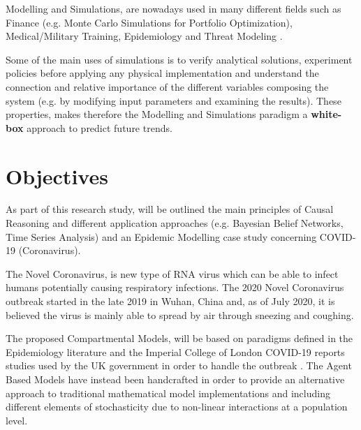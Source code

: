 Modelling and Simulations, are nowadays used in many different fields such as Finance (e.g. Monte Carlo Simulations for Portfolio Optimization), Medical/Military Training, Epidemiology and Threat Modeling \cite{mod_2, mod_3}. 

Some of the main uses of simulations is to verify analytical solutions, experiment policies before applying any physical implementation and understand the connection and relative importance of the different variables composing the system (e.g. by modifying input parameters and examining the results). These properties, makes therefore the Modelling and Simulations paradigm a \textbf{white-box} approach to predict future trends.

\section{Objectives}
\vspace{-0.1cm}
As part of this research study, will be outlined the main principles of Causal Reasoning and different application approaches (e.g. Bayesian Belief Networks, Time Series Analysis) and an Epidemic Modelling case study concerning COVID-19 (Coronavirus). 

The Novel Coronavirus, is new type of RNA virus which can be able to infect humans potentially causing respiratory infections. The 2020 Novel Coronavirus outbreak started in the late 2019 in Wuhan, China and, as of July 2020, it is believed the virus is mainly able to spread by air through sneezing and coughing. 

The proposed Compartmental Models, will be based on paradigms defined in the Epidemiology literature and the Imperial College of London COVID-19 reports studies used by the UK government in order to handle the outbreak \cite{mod_4}. The Agent Based Models have instead been handcrafted in order to provide an alternative approach to traditional mathematical model implementations and including different elements of stochasticity due to non-linear interactions at a population level. 